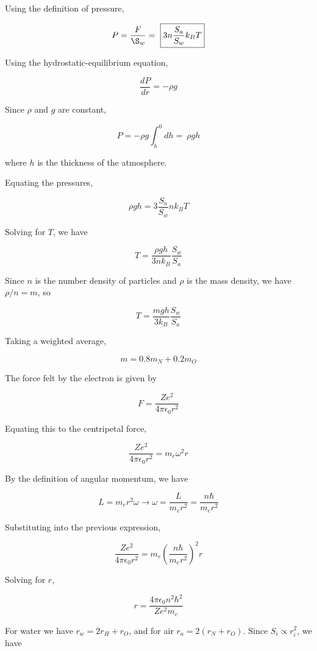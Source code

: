 \documentclass[11pt]{article}
\begin{document}
\begin{pproblem}
\begin{pssolution*}{}{}
\begin{alternativas}
    \item Using the definition of pressure,
    
    \[P = \frac{F}{\S_w} = \ \boxed{3n\frac{S_a}{S_w}k_B T} \]

    \item Using the hydrostatic-equilibrium equation,
    
    \[\frac{dP}{dr} = -\rho g\]

    Since \(\rho\) and \(g\) are constant,

    \[P = -\rho g \int_h^0dh= \ \boxed{\rho g h}\]

    where \(h\) is the thickness of the atmosphere.

    \item Equating the pressures,

    \[\rho g h = 3\frac{S_a}{S_w}nk_BT\]

    Solving for \(T\), we have

    \[T = \frac{\rho g h}{3nk_B}\frac{S_w}{S_a}\]

    Since \(n\) is the number density of particles and \(\rho\) is the mass density, we have \(\rho/n = m\), so

    \[\boxed{T= \frac{m g h}{3k_B}\frac{S_w}{S_a}}\]

    \item Taking a weighted average,
    
    \[\boxed{m = 0.8 m_N + 0.2 m_O}\]

    \item The force felt by the electron is given by
    
    \[F = \frac{Ze^2}{4\pi \epsilon_0r^2}\]

    Equating this to the centripetal force,

    \[\frac{Ze^2}{4\pi \epsilon_0r^2} = m_e \omega^2 r\]

    By the definition of angular momentum, we have

    \[L = m_er^2\omega \rightarrow \omega = \frac{L}{m_er^2} = \frac{n\hbar}{m_er^2}\]

    Substituting into the previous expression,

    \[\frac{Ze^2}{4\pi\epsilon_0 r^2} = m_e \left(\frac{n\hbar}{m_er^2}\right)^2 r\]

    Solving for \(r\),

    \[r = \frac{4\pi\epsilon_0 n^2\hbar ^2}{Z e^2 m_e}\]

    \item For water we have \(r_w = 2r_H + r_O\), and for air \(r_a = 2(r_N + r_O)\). Since \(S_i \propto r_i^2\), we have
    

\end{alternativas}
\end{pssolution*}
\end{pproblem}
\end{document}
